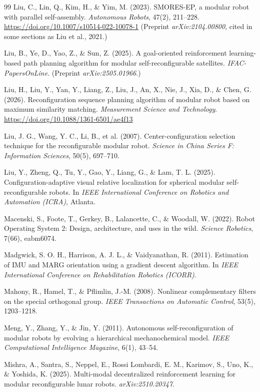 \documentclass[11pt,a4paper]{article}
\begin{document}
{\begin{thebibliography}{99}
Liu, C., Lin, Q., Kim, H., \& Yim, M. (2023). SMORES-EP, a modular robot with
parallel self-assembly. \textit{Autonomous Robots}, 47(2), 211--228.
\url{https://doi.org/10.1007/s10514-022-10078-1}
(Preprint \textit{arXiv:2104.00800}, cited in some sections as Liu et al.,
2021.)

Liu, B., Ye, D., Yao, Z., \& Sun, Z. (2025). A goal-oriented reinforcement
learning-based path planning algorithm for modular self-reconfigurable
satellites. \textit{IFAC-PapersOnLine}. (Preprint \textit{arXiv:2505.01966}.)

Liu, H., Liu, Y., Yan, Y., Liang, Z., Liu, J., An, X., Nie, J., Xia, D., \&
Chen, G. (2026). Reconfiguration sequence planning algorithm of modular robot
based on maximum similarity matching. \textit{Measurement Science and
Technology}. \url{https://doi.org/10.1088/1361-6501/ae4f13}

Liu, J. G., Wang, Y. C., Li, B., et al. (2007). Center-configuration selection
technique for the reconfigurable modular robot. \textit{Science in China Series
F: Information Sciences}, 50(5), 697--710.

Liu, Y., Zheng, Q., Tu, Y., Gao, Y., Liang, G., \& Lam, T. L. (2025).
Configuration-adaptive visual relative localization for spherical modular
self-reconfigurable robots. In \textit{IEEE International Conference on
Robotics and Automation (ICRA)}, Atlanta.

Macenski, S., Foote, T., Gerkey, B., Lalancette, C., \& Woodall, W. (2022).
Robot Operating System 2: Design, architecture, and uses in the wild.
\textit{Science Robotics}, 7(66), eabm6074.

Madgwick, S. O. H., Harrison, A. J. L., \& Vaidyanathan, R. (2011). Estimation
of IMU and MARG orientation using a gradient descent algorithm. In
\textit{IEEE International Conference on Rehabilitation Robotics (ICORR)}.

Mahony, R., Hamel, T., \& Pflimlin, J.-M. (2008). Nonlinear complementary
filters on the special orthogonal group. \textit{IEEE Transactions on Automatic
Control}, 53(5), 1203--1218.

Meng, Y., Zhang, Y., \& Jin, Y. (2011). Autonomous self-reconfiguration of
modular robots by evolving a hierarchical mechanochemical model. \textit{IEEE
Computational Intelligence Magazine}, 6(1), 43--54.

Mishra, A., Santra, S., Neppel, E., Rossi Lombardi, E. M., Karimov, S., Uno,
K., \& Yoshida, K. (2025). Multi-modal decentralized reinforcement learning for
modular reconfigurable lunar robots. \textit{arXiv:2510.20347}.


\end{thebibliography}}
\end{document}
